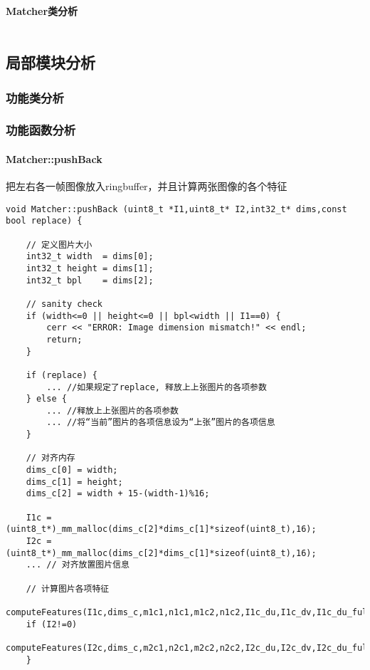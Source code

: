 \documentclass[UTF8]{ctexart}
\begin{document}
    \paragraph{Matcher类分析}
    \begin{verbatim}

    \end{verbatim}
    \subsection{局部模块分析}
    \subsubsection{功能类分析}
    \subsubsection{功能函数分析}
    \paragraph{Matcher::pushBack} 
        把左右各一帧图像放入ringbuffer，并且计算两张图像的各个特征
    \begin{verbatim}
void Matcher::pushBack (uint8_t *I1,uint8_t* I2,int32_t* dims,const bool replace) {
    
    // 定义图片大小
    int32_t width  = dims[0];
    int32_t height = dims[1];
    int32_t bpl    = dims[2];

    // sanity check
    if (width<=0 || height<=0 || bpl<width || I1==0) {
        cerr << "ERROR: Image dimension mismatch!" << endl;
        return;
    }

    if (replace) {
        ... //如果规定了replace, 释放上上张图片的各项参数
    } else {
        ... //释放上上张图片的各项参数
        ... //将“当前”图片的各项信息设为“上张”图片的各项信息
    }

    // 对齐内存
    dims_c[0] = width;
    dims_c[1] = height;
    dims_c[2] = width + 15-(width-1)%16;

    I1c = (uint8_t*)_mm_malloc(dims_c[2]*dims_c[1]*sizeof(uint8_t),16);
    I2c = (uint8_t*)_mm_malloc(dims_c[2]*dims_c[1]*sizeof(uint8_t),16);
    ... // 对齐放置图片信息

    // 计算图片各项特征
    computeFeatures(I1c,dims_c,m1c1,n1c1,m1c2,n1c2,I1c_du,I1c_dv,I1c_du_full,I1c_dv_full);
    if (I2!=0)
        computeFeatures(I2c,dims_c,m2c1,n2c1,m2c2,n2c2,I2c_du,I2c_dv,I2c_du_full,I2c_dv_full);
    }
    \end{verbatim}
\end{document}
